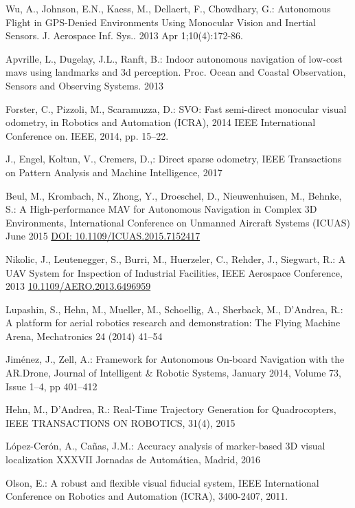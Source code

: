 \documentclass{styles/svproc}
\begin{document}
%
%
\begin{thebibliography}{6}
Wu, A., Johnson, E.N., Kaess, M., Dellaert, F., Chowdhary, G.: Autonomous Flight in GPS-Denied Environments Using Monocular Vision and Inertial Sensors. J. Aerospace Inf. Sys.. 2013 Apr 1;10(4):172-86.

Apvrille, L., Dugelay, J.L., Ranft, B.: Indoor autonomous navigation of low-cost mavs using landmarks and 3d perception. Proc. Ocean and Coastal Observation, Sensors and Observing Systems. 2013 

Forster, C., Pizzoli, M., Scaramuzza, D.: SVO: Fast semi-direct monocular visual odometry, in Robotics and Automation (ICRA), 2014
IEEE International Conference on. IEEE, 2014, pp. 15–22.

J., Engel, Koltun, V., Cremers, D.,: Direct sparse odometry, IEEE Transactions on Pattern Analysis and Machine Intelligence, 2017

Beul, M., Krombach, N., Zhong, Y., Droeschel, D., Nieuwenhuisen, M., Behnke, S.: A High-performance MAV for Autonomous Navigation in Complex 3D Environments, International Conference on Unmanned Aircraft Systems (ICUAS) June 2015 \url{DOI: 10.1109/ICUAS.2015.7152417}

Nikolic, J., Leutenegger, S., Burri, M., Huerzeler, C., Rehder, J., Siegwart, R.: A UAV System for Inspection of Industrial Facilities, IEEE Aerospace Conference, 2013 \url{10.1109/AERO.2013.6496959}

Lupashin, S., Hehn, M., Mueller, M., Schoellig, A., Sherback, M., D’Andrea, R.: A platform for aerial robotics research and demonstration: The Flying Machine Arena, Mechatronics 24 (2014) 41–54

Jiménez, J., Zell, A.: Framework for Autonomous On-board Navigation with the AR.Drone, Journal of Intelligent \& Robotic Systems, January 2014, Volume 73, Issue 1–4, pp 401–412

Hehn, M., D'Andrea, R.: Real-Time Trajectory Generation for Quadrocopters, IEEE TRANSACTIONS ON ROBOTICS,  31(4), 2015

López-Cerón, A., Cañas, J.M.: Accuracy analysis of marker-based 3D visual localization
 XXXVII Jornadas de Automática, Madrid, 2016 %

Olson, E.: A robust and flexible visual fiducial system, IEEE International Conference on Robotics and Automation (ICRA), 3400-2407, 2011.


\end{thebibliography}
\end{document}
